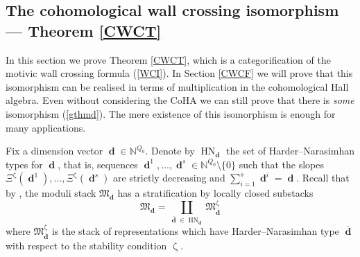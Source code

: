 \documentclass[a4paper,10pt]{amsart}
\renewcommand{\zeta}{\upzeta}
\DeclareMathOperator{\HN}{HN}
\newcommand{\Mu}{\Xi}
\newcommand{\Mst}{\mathfrak{M}}
\DeclareMathOperator{\dd}{\mathbf{d}}
\DeclareMathOperator{\op}{op}
\begin{document}
\subsection{The cohomological wall crossing isomorphism --- Theorem \ref{CWCT}}
\label{cwcfSec}
In this section we prove Theorem \ref{CWCT}, which is a categorification of the motivic wall crossing formula (\ref{WCI}).  In Section \ref{CWCF} we will prove that this isomorphism can be realised in terms of multiplication in the cohomological Hall algebra.  Even without considering the CoHA we can still prove that there is \textit{some} isomorphism (\ref{gthmd}).  The mere existence of this isomorphism is enough for many applications.

Fix a dimension vector $\dd\in\mathbb{N}^{Q_0}$.  Denote by $\HN_{\dd}$ the set of Harder--Narasimhan types for $\dd$, that is, sequences $\dd^1,\ldots,\dd^s\in\mathbb{N}^{Q_0}\setminus \{0\}$ such that the slopes $\Mu^{\zeta}(\dd^1),\ldots,\Mu^{\zeta}(\dd^s)$ are strictly decreasing and $\sum_{i=1}^s \dd^i=\dd$.
Recall that by \cite[Prop.3.4]{Reineke_HN}, the moduli stack $\Mst_{\dd}$ has a stratification by locally closed substacks 
\begin{equation}
\label{HNstrat}
\Mst_{\dd}=\coprod_{\overline{\dd}\in\HN_{\dd}}\Mst_{\overline{\dd}}^{\zeta}
\end{equation}
where $\Mst_{\overline{\dd}}^{\zeta}$ is the stack of representations which have Harder--Narasimhan type $\overline{\dd}$ with respect to the stability condition $\zeta$.  
\end{document}
